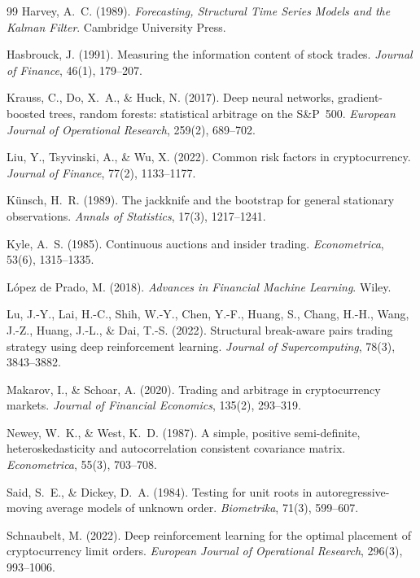 \documentclass[11pt]{article}
\begin{document}
\begin{thebibliography}{99}
Harvey, A.~C. (1989). \emph{Forecasting, Structural Time Series Models and the
Kalman Filter}. Cambridge University Press.

Hasbrouck, J. (1991). Measuring the information content of stock trades.
\emph{Journal of Finance}, 46(1), 179--207.

Krauss, C., Do, X.~A., \& Huck, N. (2017). Deep neural networks, gradient-boosted trees,
random forests: statistical arbitrage on the S\&P~500. \emph{European Journal of
Operational Research}, 259(2), 689--702.

Liu, Y., Tsyvinski, A., \& Wu, X. (2022). Common risk factors in cryptocurrency.
\emph{Journal of Finance}, 77(2), 1133--1177.

K\"unsch, H.~R. (1989). The jackknife and the bootstrap for general stationary
observations. \emph{Annals of Statistics}, 17(3), 1217--1241.

Kyle, A.~S. (1985). Continuous auctions and insider trading.
\emph{Econometrica}, 53(6), 1315--1335.

L\'opez de Prado, M. (2018). \emph{Advances in Financial Machine Learning}. Wiley.

Lu, J.-Y., Lai, H.-C., Shih, W.-Y., Chen, Y.-F., Huang, S., Chang, H.-H., Wang, J.-Z.,
Huang, J.-L., \& Dai, T.-S. (2022). Structural break-aware pairs trading strategy using
deep reinforcement learning. \emph{Journal of Supercomputing}, 78(3), 3843--3882.

Makarov, I., \& Schoar, A. (2020). Trading and arbitrage in cryptocurrency markets.
\emph{Journal of Financial Economics}, 135(2), 293--319.

Newey, W.~K., \& West, K.~D. (1987). A simple, positive semi-definite,
heteroskedasticity and autocorrelation consistent covariance matrix.
\emph{Econometrica}, 55(3), 703--708.

Said, S.~E., \& Dickey, D.~A. (1984). Testing for unit roots in autoregressive-moving
average models of unknown order. \emph{Biometrika}, 71(3), 599--607.

Schnaubelt, M. (2022). Deep reinforcement learning for the optimal placement of cryptocurrency
limit orders. \emph{European Journal of Operational Research}, 296(3), 993--1006.


\end{thebibliography}
\end{document}
